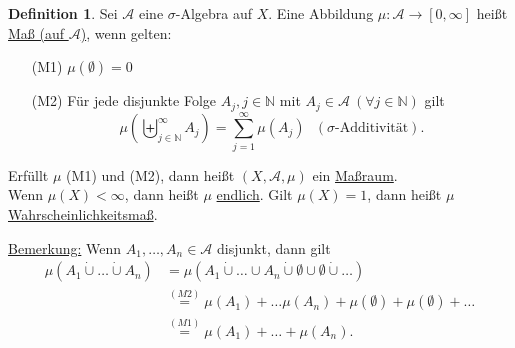 \documentclass[a4paper]{report}
\newcommand{\N}{\mathbb{N}}
\newcommand{\dcup}{\dot{\cup}}
\newcommand{\bigdcup}{\biguplus}
\newcommand{\jlabel}[1]{\label{j_#1}}
\newcommand{\jspace}{\vspace{8pt}}
\theoremstyle{plain}
\theoremstyle{definition}
\newtheorem{defn}[thm]{Definition}
\begin{document}
{{\begin{defn}
\jlabel{Def 1.12}
    Sei $\mathcal{A}$ eine $\sigma$-Algebra auf $X$. Eine Abbildung $\mu: \mathcal{A} \rightarrow [0, \infty]$ heißt \uline{Maß (auf $\mathcal{A}$)}, wenn gelten:
    \begin{itemize}
        \item[(M1)] $\mu(\emptyset) = 0$
        \item[(M2)] Für jede disjunkte Folge $A_j, j\in\N$ mit $A_j \in \mathcal{A} \ (\forall j\in\N)$ gilt
        \begin{displaymath}
            \mu \left(\bigdcup_{j \in\N}^\infty A_j \right) = \sum_{j=1}^\infty \mu(A_j)\ \ \  (\sigma\text{-Additivität}).
        \end{displaymath}
    \end{itemize}
    Erfüllt $\mu$ (M1) und (M2), dann heißt $(X, \mathcal{A}, \mu)$ ein \uline{Maßraum}.\\
    Wenn $\mu(X) < \infty$, dann heißt $\mu$ \uline{endlich}. Gilt $\mu(X) = 1$, dann heißt $\mu$ \\ \uline{Wahrscheinlichkeitsmaß}.
    
    \jspace
    
    \uline{Bemerkung:} Wenn $A_1, \dots, A_n \in \mathcal{A}$ disjunkt, dann gilt
    \begin{displaymath}
        \begin{split}
            \mu(A_1 \dcup \dots \dcup A_n) &= \mu(A_1 \dcup \dots \cup A_n \dcup \emptyset \cup \emptyset \dcup \dots)\\
            &\overset{(M2)}{=} \mu(A_1) + \dots \mu(A_n) + \mu(\emptyset) + \mu(\emptyset) + \dots\\
            &\overset{(M1)}{=} \mu(A_1) + \dots + \mu(A_n).
        \end{split}
    \end{displaymath}
\end{defn}


}}
\end{document}
